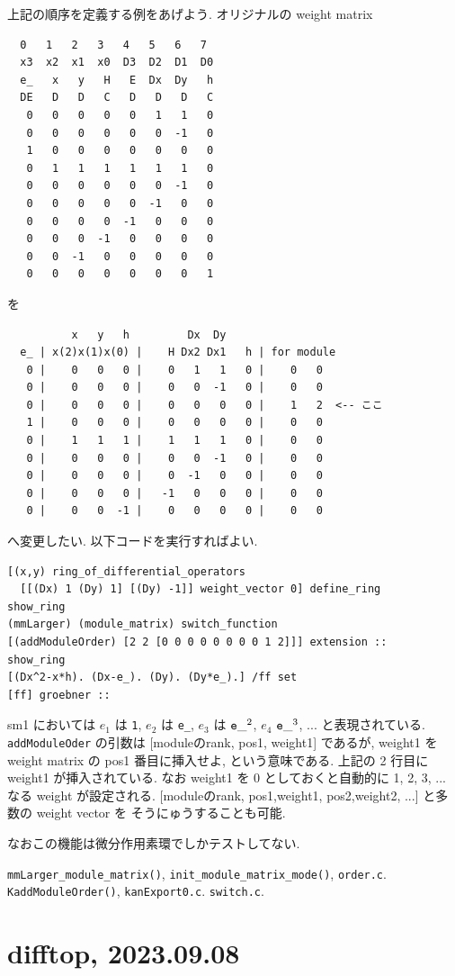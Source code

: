 \documentclass{jarticle}
\begin{document}
上記の順序を定義する例をあげよう.
オリジナルの weight matrix 
{\footnotesize
\begin{verbatim}
  0   1   2   3   4   5   6   7
  x3  x2  x1  x0  D3  D2  D1  D0
  e_   x   y   H   E  Dx  Dy   h
  DE   D   D   C   D   D   D   C
   0   0   0   0   0   1   1   0
   0   0   0   0   0   0  -1   0
   1   0   0   0   0   0   0   0
   0   1   1   1   1   1   1   0
   0   0   0   0   0   0  -1   0
   0   0   0   0   0  -1   0   0
   0   0   0   0  -1   0   0   0
   0   0   0  -1   0   0   0   0
   0   0  -1   0   0   0   0   0
   0   0   0   0   0   0   0   1
\end{verbatim}
}
を
{\footnotesize
\begin{verbatim}
          x   y   h         Dx  Dy
  e_ | x(2)x(1)x(0) |    H Dx2 Dx1   h | for module
   0 |    0   0   0 |    0   1   1   0 |    0   0
   0 |    0   0   0 |    0   0  -1   0 |    0   0
   0 |    0   0   0 |    0   0   0   0 |    1   2  <-- ここ
   1 |    0   0   0 |    0   0   0   0 |    0   0
   0 |    1   1   1 |    1   1   1   0 |    0   0
   0 |    0   0   0 |    0   0  -1   0 |    0   0
   0 |    0   0   0 |    0  -1   0   0 |    0   0
   0 |    0   0   0 |   -1   0   0   0 |    0   0
   0 |    0   0  -1 |    0   0   0   0 |    0   0
\end{verbatim}
}
\noindent
へ変更したい.
以下コードを実行すればよい.
{\footnotesize
\begin{verbatim}
[(x,y) ring_of_differential_operators
  [[(Dx) 1 (Dy) 1] [(Dy) -1]] weight_vector 0] define_ring
show_ring
(mmLarger) (module_matrix) switch_function
[(addModuleOrder) [2 2 [0 0 0 0 0 0 0 0 1 2]]] extension ::
show_ring 
[(Dx^2-x*h). (Dx-e_). (Dy). (Dy*e_).] /ff set
[ff] groebner ::
\end{verbatim}
}
sm1 においては $e_1$ は {\tt 1}, $e_2$ は {\tt e\_}, $e_3$ は ${\tt e\_}^2$,
$e_4$ ${\tt e\_}^3$, ... と表現されている.
{\tt addModuleOder} の引数は
[moduleのrank, pos1, weight1] であるが,
weight1 を weight matrix の pos1 番目に挿入せよ,
という意味である.
上記の 2 行目に weight1 が挿入されている.
なお weight1 を 0 としておくと自動的に 1, 2, 3, ... なる weight が設定される.
[moduleのrank, pos1,weight1, pos2,weight2, ...] と多数の weight vector を
そうにゅうすることも可能.

なおこの機能は微分作用素環でしかテストしてない.

{\tt mmLarger\_module\_matrix()}, 
{\tt init\_module\_matrix\_mode()}, {\tt order.c}.
{\tt KaddModuleOrder()}, {\tt kanExport0.c}.
{\tt switch.c}.

\section{difftop, 2023.09.08}
\end{document}
